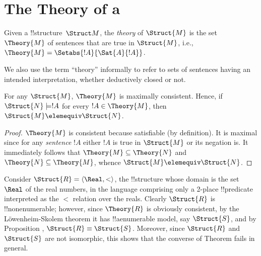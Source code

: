 \documentclass[../../include/open-logic-section]{subfiles}
\begin{document}
\section{The Theory of a }

\begin{defn}
  Given a !!{structure}~$\Struct M$, the \emph{theory} of
  $\Struct{M}$ is the set $\Theory{M}$ of sentences
  that are true in $\Struct{M}$, i.e., $\Theory{M} =
  \Setabs{!A}{\Sat{A}{!A}}$.
\end{defn}

We also use the term ``theory'' informally to refer to sets
of sentences having an intended interpretation, whether deductively
closed or not.

\begin{prop}
  For any $\Struct{M}$,  $\Theory{M}$ is maximally
  consistent. Hence, if $\Struct{N} \models !A$ for every $!A
  \in \Theory{M}$, then $\Struct{M} \elemequiv
  \Struct{N}$.
\end{prop}

\begin{proof}
  $\Theory{M}$ is consistent because satisfiable (by definition). It
  is maximal since for any \emph{sentence} $!A$ either $!A$ is true in
  $\Struct{M}$ or its negation is. It immediately follows that
  $\Theory{M} \subseteq \Theory{N}$ and $\Theory{N} \subseteq
  \Theory{M}$, whence $\Struct{M} \elemequiv \Struct{N}$.
\end{proof}

\begin{rem}
  Consider $\Struct{R} = \langle\Real, <\rangle$, the !!{structure}
  whose domain is the set $\Real$ of the real numbers, in the language
  comprising only a 2-place !!{predicate} interpreted as the $<$
  relation over the reals. Clearly $\Struct{R}$ is !!{nonenumerable};
  however, since $\Theory{R}$ is obviously consistent, by the
  L\"owenheim-Skolem theorem it has !!a{enumerable} model, say
  $\Struct{S}$, and by Proposition , $\Struct{R}
  \equiv \Struct{S}$. Moreover, since $\Struct{R}$ and $\Struct{S}$
  are not isomorphic, this shows that the converse of Theorem
   fails in general.
\end{rem}
\end{document}
